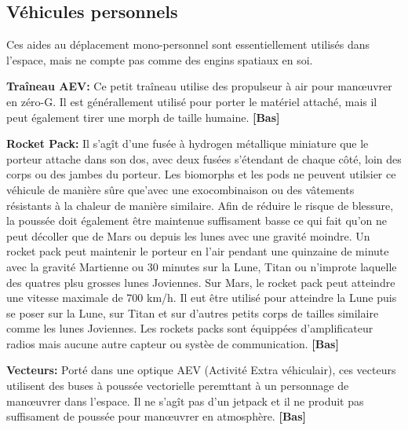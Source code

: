 \subsection{Véhicules personnels} \label{sec:personal-vehicles} 

Ces aides au déplacement mono-personnel sont essentiellement utilisés dans l'espace, mais ne compte pas comme des engins spatiaux en soi. 

\textbf{Traîneau AEV:} Ce petit traîneau utilise des propulseur à air pour manœuvrer en zéro-G. Il est générallement utilisé pour porter le matériel attaché, mais il peut également tirer une morph de taille humaine. \textbf{[Bas]} 

\textbf{Rocket Pack:} Il s'agît d'une fusée à hydrogen métallique miniature que le porteur attache dans son dos, avec deux fusées s'étendant de chaque côté, loin des corps ou des jambes du porteur. Les biomorphs et les pods ne peuvent utilsier ce véhicule de manière sûre que'avec une exocombinaison ou des vâtements résistants à la chaleur de manière similaire. Afin de réduire le risque de blessure, la poussée doit également être maintenue suffisament basse ce qui fait qu'on ne peut décoller que de Mars ou depuis les lunes avec une gravité moindre. Un rocket pack peut maintenir le porteur en l'air pendant une quinzaine de minute avec la gravité Martienne ou 30 minutes sur la Lune, Titan ou n'improte laquelle des quatres plsu grosses lunes Joviennes. Sur Mars, le rocket pack peut atteindre une vitesse maximale de 700 km/h. Il eut être utilisé pour atteindre la Lune puis se poser sur la Lune, sur Titan et sur d'autres petits corps de tailles similaire comme les lunes Joviennes. Les rockets packs sont équippées d'amplificateur radios mais aucune autre capteur ou systèe de communication. \textbf{[Bas]} 

\textbf{Vecteurs:} Porté dans une optique AEV (Activité Extra véhiculair), ces vecteurs utilisent des buses à poussée vectorielle peremttant à un personnage de manœuvrer dans l'espace. Il ne s'agît pas d'un jetpack et il ne produit pas suffisament de poussée pour manœuvrer en atmosphère. \textbf{[Bas]} 

